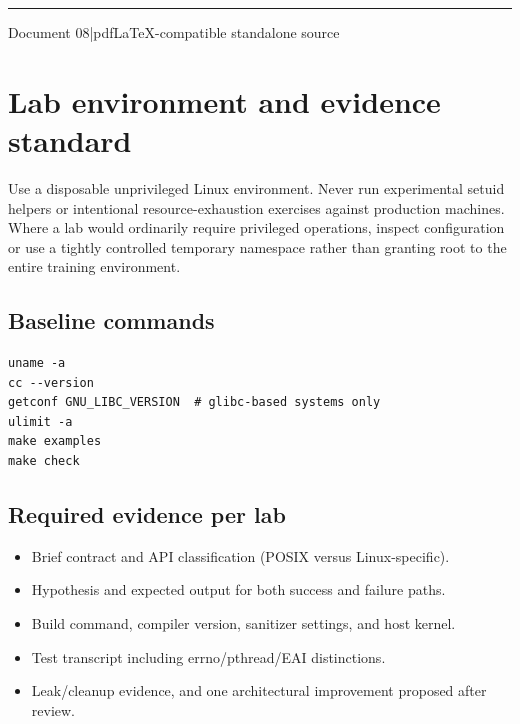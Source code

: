 \documentclass[11pt,letterpaper,oneside]{report}
\begin{document}
\hypersetup{pageanchor=false}%
\begin{titlepage}\centering{}\vspace{0.6cm}{\Large Twenty structured labs, fault injection and assessment\par}\vspace{2cm}\rule{0.75\textwidth}{1.2pt}\par\vspace{0.55cm}{\large An original companion to Michael Kerrisk\textquotesingle s 2010 text}\par\vspace{0.3cm}{\large Edition 1.0\quad |\quad October 2026}\par\vfill{\small Document 08\quad |\quad pdfLaTeX-compatible standalone source}\par\end{titlepage}\hypersetup{pageanchor=true}
\tableofcontents\clearpage
\chapter{Lab environment and evidence standard}
Use a disposable unprivileged Linux environment. Never run experimental setuid helpers or intentional resource-exhaustion exercises against production machines. Where a lab would ordinarily require privileged operations, inspect configuration or use a tightly controlled temporary namespace rather than granting root to the entire training environment.

\section{Baseline commands}
\begin{lstlisting}
uname -a
cc --version
getconf GNU_LIBC_VERSION  # glibc-based systems only
ulimit -a
make examples
make check
\end{lstlisting}
\section{Required evidence per lab}
\begin{itemize}
\item Brief contract and API classification (POSIX versus Linux-specific).
\item Hypothesis and expected output for both success and failure paths.
\item Build command, compiler version, sanitizer settings, and host kernel.
\item Test transcript including errno/pthread/EAI distinctions.
\item Leak/cleanup evidence, and one architectural improvement proposed after review.
\end{itemize}
\end{document}
